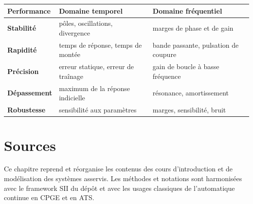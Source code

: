 \begin{center}
\begin{tabularx}{\linewidth}{>{\bfseries}p{.19\linewidth}X X}
\toprule
Performance & Domaine temporel & Domaine fréquentiel \\
\midrule
Stabilité & pôles, oscillations, divergence & marges de phase et de gain \\
Rapidité & temps de réponse, temps de montée & bande passante, pulsation de coupure \\
Précision & erreur statique, erreur de traînage & gain de boucle à basse fréquence \\
Dépassement & maximum de la réponse indicielle & résonance, amortissement \\
Robustesse & sensibilité aux paramètres & marges, sensibilité, bruit \\
\bottomrule
\end{tabularx}
\end{center}

\section{Sources}\label{sec:sa-sources}

Ce chapitre reprend et réorganise les contenus des cours d'introduction et de modélisation des systèmes asservis. Les méthodes et notations sont harmonisées avec le framework SII du dépôt et avec les usages classiques de l'automatique continue en CPGE et en ATS.
